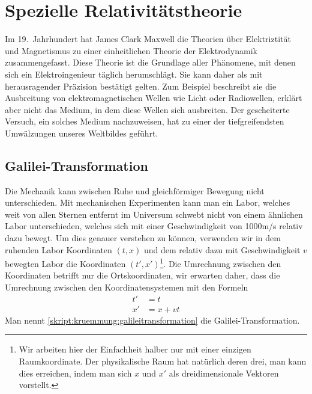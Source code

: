 %
%
%

\chapter{Spezielle Relativitätstheorie%
\label{skript:chapter:spezielle}}
\rhead{}
Im 19.~Jahrhundert hat James Clark Maxwell die Theorien
über Elektriztität und Magnetismus zu einer einheitlichen Theorie
der Elektrodynamik zusammengefasst.
Diese Theorie ist die Grundlage aller Phänomene, mit denen sich
ein Elektroingenieur täglich herumschlägt.
Sie kann daher als mit herausragender Präzision bestätigt gelten.
Zum Beispiel beschreibt sie die Ausbreitung von elektromagnetischen
Wellen wie Licht oder Radiowellen, erklärt aber nicht das Medium, in
dem diese Wellen sich ausbreiten.
Der gescheiterte Versuch, ein solches Medium nachzuweisen, hat zu einer
der tiefgreifendsten Umwälzungen unseres Weltbildes geführt.

\section{Galilei-Transformation}
Die Mechanik kann zwischen Ruhe und gleichförmiger Bewegung nicht 
unterschieden.
Mit mechanischen Experimenten kann man ein Labor, welches weit von
allen Sternen entfernt im Universum schwebt nicht von einem ähnlichen
Labor unterschieden, welches sich mit einer Geschwindigkeit von 1000m/s
relativ dazu bewegt.
Um dies genauer verstehen zu können, verwenden wir in dem ruhenden Labor
Koordinaten $(t,x)$ und dem relativ dazu mit Geschwindigkeit $v$ bewegten
Labor die Koordinaten
$(t',x')$\footnote{Wir arbeiten hier der Einfachheit halber nur mit einer
einzigen Raumkoordinate.
Der physikalische Raum hat natürlich deren drei, man kann dies erreichen,
indem man sich $x$ und $x'$ als dreidimensionale Vektoren vorstellt.}.
Die Umrechnung zwischen den Koordinaten betrifft nur die Ortskoordinaten,
wir erwarten daher, dass die Umrechnung zwischen den Koordinatensystemen
mit den Formeln
\begin{equation}
\begin{aligned}
t'&=t\\
x'&=x+vt
\end{aligned}
\label{skript:kruemmung:galileitransformation}
\end{equation}
Man nennt \eqref{skript:kruemmung:galileitransformation} die
Galilei-Transformation.

